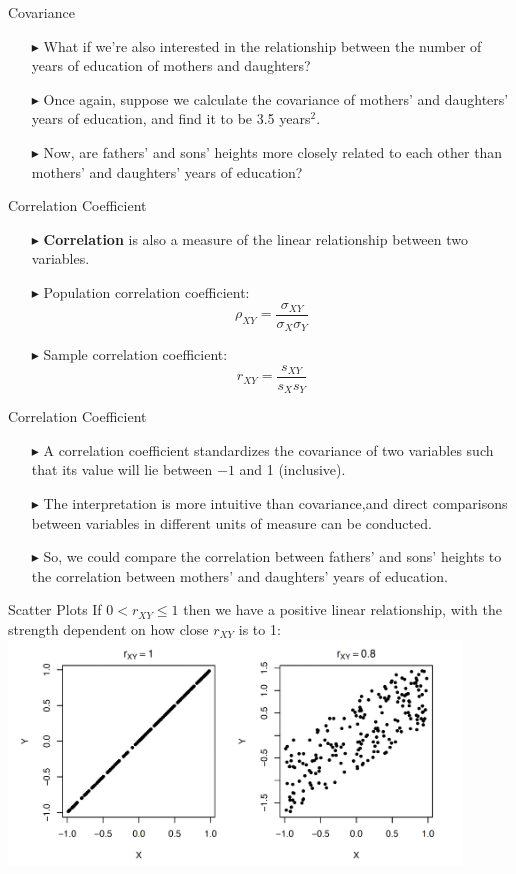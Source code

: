 \documentclass[12pt]{beamer}
\begin{document}
\begin{frame}{Covariance}
	\begin{itemize}
		\item[$\blacktriangleright$] What if we're also interested in the relationship between the number of years of education of mothers and daughters?
		\item[$\blacktriangleright$] Once again, suppose we calculate the covariance of mothers' and daughters' years of education, and find it to be 3.5 years$^2$.
		\item[$\blacktriangleright$] Now, are fathers' and sons' heights more closely related to each other than mothers' and daughters' years of education?
	\end{itemize}
\end{frame}
\begin{frame}{Correlation Coefficient}
	\begin{itemize}
		\item[$\blacktriangleright$] {\bf Correlation} is also a measure of the linear relationship between two variables.
		\item[$\blacktriangleright$] Population correlation coefficient:
		$$\rho_{XY}=\frac{\sigma_{XY}}{\sigma_X\sigma_Y}$$
		\item[$\blacktriangleright$] Sample correlation coefficient:
		$$r_{XY}=\frac{s_{XY}}{s_Xs_Y}$$
	\end{itemize}
\end{frame}
\begin{frame}{Correlation Coefficient}
	\begin{itemize}
		\item[$\blacktriangleright$] A correlation coefficient standardizes the covariance of two variables such that its value will lie between $-1$ and 1 (inclusive).
		\item[$\blacktriangleright$] The interpretation is more intuitive than covariance,and direct comparisons between variables in different units of measure can be conducted.
		\item[$\blacktriangleright$] So, we could compare the correlation between fathers' and sons' heights to the correlation between mothers' and daughters' years of education.
	\end{itemize}
\end{frame}
\begin{frame}{Scatter Plots}
If $0<r_{XY}\le1$ then we have a positive linear relationship, with the strength dependent on how close $r_{XY}$ is to 1:
\centering
\includegraphics[width=12cm]{scatter.png}
\end{frame}
\end{document}
